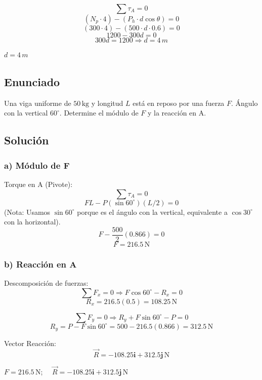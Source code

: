 \documentclass[12pt, a4paper]{article}
\begin{document}
$$ \sum \tau_A = 0 $$
$$ (N_p \cdot 4) - (P_h \cdot d \cos \theta) = 0 $$
$$ (300 \cdot 4) - (500 \cdot d \cdot 0.6) = 0 $$
$$ 1200 - 300d = 0 $$
$$ 300d = 1200 \Rightarrow d = 4 \, \si{m} $$

\begin{tcolorbox}[colback=green!5!white, colframe=green!50!black, title=Respuesta]
$d = 4 \, \si{m}$
\end{tcolorbox}

\newpage

\subsection*{Enunciado}
Una viga uniforme de $50 \, \text{kg}$ y longitud $L$ está en reposo por una fuerza $F$. Ángulo con la vertical $60^\circ$. Determine el módulo de $F$ y la reacción en A.

\begin{center}
\end{center}

\subsection*{Solución}
\subsubsection*{a) Módulo de F}
Torque en A (Pivote):
$$ \sum \tau_A = 0 $$
$$ F L - P (\sin 60^\circ)(L/2) = 0 $$
(Nota: Usamos $\sin 60^\circ$ porque es el ángulo con la vertical, equivalente a $\cos 30^\circ$ con la horizontal).
$$ F - \frac{500}{2} (0.866) = 0 $$
$$ F = 216.5 \, \text{N} $$

\subsubsection*{b) Reacción en A}
Descomposición de fuerzas:
$$ \sum F_x = 0 \Rightarrow F \cos 60^\circ - R_x = 0 $$
$$ R_x = 216.5 (0.5) = 108.25 \, \text{N} $$

$$ \sum F_y = 0 \Rightarrow R_y + F \sin 60^\circ - P = 0 $$
$$ R_y = P - F \sin 60^\circ = 500 - 216.5 (0.866) = 312.5 \, \text{N} $$

Vector Reacción:
$$ \vec{R} = -108.25 \mathbf{i} + 312.5 \mathbf{j} \, \text{N} $$

\begin{tcolorbox}[colback=blue!5!white, colframe=blue!50!black, title=Respuesta]
$F = 216.5 \, \text{N}$; $\quad \vec{R} = -108.25 \mathbf{i} + 312.5 \mathbf{j} \, \text{N}$
\end{tcolorbox}
\end{document}
